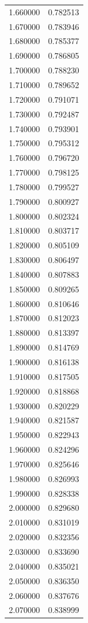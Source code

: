 \begin{tabular}{rr}
1.660000 & 0.782513 \\
1.670000 & 0.783946 \\
1.680000 & 0.785377 \\
1.690000 & 0.786805 \\
1.700000 & 0.788230 \\
1.710000 & 0.789652 \\
1.720000 & 0.791071 \\
1.730000 & 0.792487 \\
1.740000 & 0.793901 \\
1.750000 & 0.795312 \\
1.760000 & 0.796720 \\
1.770000 & 0.798125 \\
1.780000 & 0.799527 \\
1.790000 & 0.800927 \\
1.800000 & 0.802324 \\
1.810000 & 0.803717 \\
1.820000 & 0.805109 \\
1.830000 & 0.806497 \\
1.840000 & 0.807883 \\
1.850000 & 0.809265 \\
1.860000 & 0.810646 \\
1.870000 & 0.812023 \\
1.880000 & 0.813397 \\
1.890000 & 0.814769 \\
1.900000 & 0.816138 \\
1.910000 & 0.817505 \\
1.920000 & 0.818868 \\
1.930000 & 0.820229 \\
1.940000 & 0.821587 \\
1.950000 & 0.822943 \\
1.960000 & 0.824296 \\
1.970000 & 0.825646 \\
1.980000 & 0.826993 \\
1.990000 & 0.828338 \\
2.000000 & 0.829680 \\
2.010000 & 0.831019 \\
2.020000 & 0.832356 \\
2.030000 & 0.833690 \\
2.040000 & 0.835021 \\
2.050000 & 0.836350 \\
2.060000 & 0.837676 \\
2.070000 & 0.838999 \\

\end{tabular}
